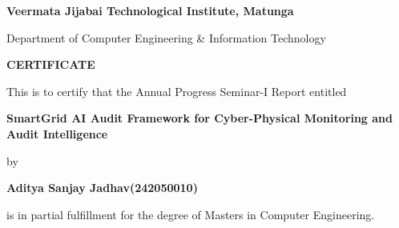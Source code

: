 \vspace*{1\baselineskip}
\vspace*{1\baselineskip}
\begin{center}\begin{LARGE} \textbf{Veermata Jijabai Technological Institute, Matunga}\end{LARGE} \end{center}
\vspace*{1\baselineskip}
 \begin{center}\begin{large}Department of Computer Engineering \& Information Technology\\ \end{large}\end{center} 
 \vspace*{1\baselineskip}\vspace*{1\baselineskip}
 \begin{center} \begin{Huge} \textbf{CERTIFICATE}\end{Huge} \end{center} 
\vspace*{1\baselineskip}\vspace*{1\baselineskip} 
 \begin{center}\begin{large}This is to certify that the Annual Progress Seminar-I Report entitled\end{large} \end{center}
\vspace*{1\baselineskip} 
 \begin{center} 
 \begin{Large}\textbf{	SmartGrid AI Audit Framework for Cyber-Physical Monitoring and Audit Intelligence}\end{Large} \end{center}
 \begin{center}by\end{center}\begin{center}
 \begin{Large}\textbf{Aditya Sanjay Jadhav(242050010)}\end{Large}\end{center}\vspace*{0\baselineskip}\begin{center} \begin{large}is in partial fulfillment for the degree of Masters in Computer Engineering.\end{large}\end{center}
\vspace*{1\baselineskip}
\vspace*{1\baselineskip}

